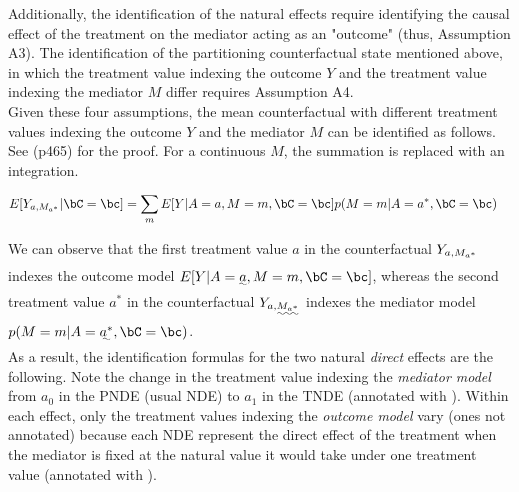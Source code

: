 \documentclass[dvipdfmx,10pt]{article}
\begin{document}
Additionally, the identification of the natural effects require identifying the causal effect of the treatment on the mediator acting as an "outcome" (thus, Assumption A3). The identification of the partitioning counterfactual state mentioned above, in which the treatment value indexing the outcome \(Y\) and the treatment value indexing the mediator \(M\) differ requires Assumption A4.\\

Given these four assumptions, the mean counterfactual with different treatment values indexing the outcome \(Y\) and the mediator \(M\) can be identified as follows. See \cite{vanderweeleExplanationCausalInference2015} (p465) for the proof. For a continuous \(M\), the summation is replaced with an integration.

\begin{align*}
E[Y_{a,M_{a^{*}}} | \bC = \bc] &= \sum_{m} E[Y | A = a, M = m, \bC = \bc] p(M = m | A = a^{*}, \bC = \bc)
\end{align*}

We can observe that the first treatment value \(a\) in the counterfactual \(Y_{\uwave{a},M_{a^{*}}}\) indexes the outcome model \(E[Y | A = \uwave{a}, M = m, \bC = \bc]\), whereas the second treatment value \(a^{*}\) in the counterfactual \(Y_{a,\uwave{M_{a^{*}}}}\) indexes the mediator model \(p(M = m | A = \uwave{a^{*}}, \bC = \bc)\).\\

As a result, the identification formulas for the two natural \emph{direct} effects are the following. Note the change in the treatment value indexing the \emph{mediator model} from \(a_{0}\) in the PNDE (usual NDE) to \(a_{1}\) in the TNDE (annotated with \uwave{~~~~}). Within each effect, only the treatment values indexing the \emph{outcome model} vary (ones not annotated) because each NDE represent the direct effect of the treatment when the mediator is fixed at the natural value it would take under one treatment value (annotated with \uwave{~~~~}).
\end{document}
